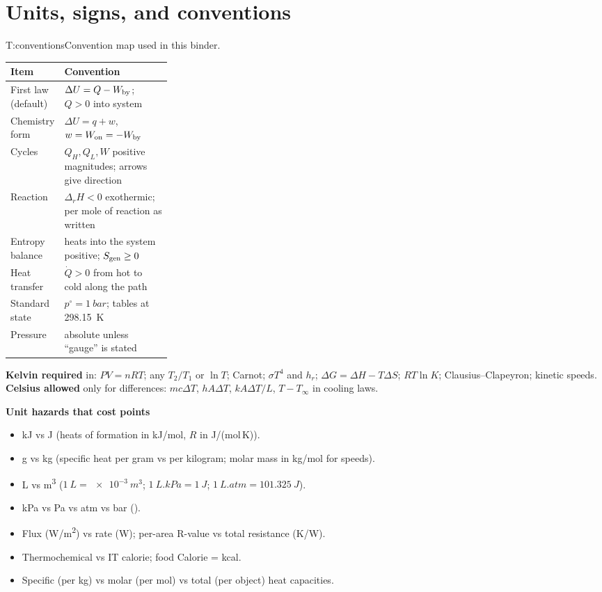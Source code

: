 \section{Units, signs, and conventions}\label{sec:units}
\begin{multicols}{2}
\begin{reftab}{T:conventions}{Convention map used in this binder.}
\small
\begin{tabularx}{\linewidth}{@{}L{0.27\linewidth}Y@{}}
\toprule
Item & Convention\\
\midrule
First law (default) & $\Delta U=Q-W_{\mathrm{by}}$; $Q>0$ into system\\
Chemistry form & $\Delta U=q+w$, $w=W_{\mathrm{on}}=-W_{\mathrm{by}}$\\
Cycles & $Q_H,Q_L,W$ positive magnitudes; arrows give direction\\
Reaction & $\Delta_rH<0$ exothermic; per mole of reaction as written\\
Entropy balance & heats into the system positive; $S_{\mathrm{gen}}\ge0$\\
Heat transfer & $\dot Q>0$ from hot to cold along the path\\
Standard state & $p^\circ=\SI{1}{bar}$; tables at \SI{298.15}{K}\\
Pressure & absolute unless ``gauge'' is stated\\
\bottomrule
\end{tabularx}\end{reftab}

\begin{keybox}\textbf{Kelvin required} in: $PV=nRT$; any $T_2/T_1$ or $\ln T$; Carnot; $\sigma T^4$ and $h_r$; $\Delta G=\Delta H-T\Delta S$; $RT\ln K$; Clausius--Clapeyron; kinetic speeds. \textbf{Celsius allowed} only for differences: $mc\Delta T$, $hA\Delta T$, $kA\Delta T/L$, $T-T_\infty$ in cooling laws.\end{keybox}

\textbf{Unit hazards that cost points}
\begin{itemize}
\item kJ vs J (heats of formation in kJ/mol, $R$ in J/(mol\,K)).
\item g vs kg (specific heat per gram vs per kilogram; molar mass in kg/mol for speeds).
\item L vs \si{m^3} ($\SI{1}{L}=\SI{e-3}{m^3}$; $\SI{1}{L.kPa}=\SI{1}{J}$; $\SI{1}{L.atm}=\SI{101.325}{J}$).
\item kPa vs Pa vs atm vs bar ().
\item Flux (\si{W/m^2}) vs rate (W); per-area R-value vs total resistance (K/W).
\item Thermochemical vs IT calorie; food Calorie = kcal.
\item Specific (per kg) vs molar (per mol) vs total (per object) heat capacities.
\end{itemize}


\end{multicols}
